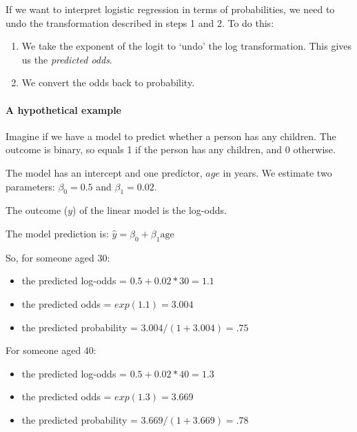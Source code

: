 \documentclass[]{article}
\providecommand{\tightlist}{%
  \setlength{\itemsep}{0pt}\setlength{\parskip}{0pt}}
\let\oldparagraph\paragraph
\renewcommand{\paragraph}[1]{\oldparagraph{#1}\mbox{}}
\begin{document}
If we want to interpret logistic regression in terms of probabilities, we need
to undo the transformation described in steps 1 and 2. To do this:

\begin{enumerate}
\def\labelenumi{\arabic{enumi}.}
\item
  We take the exponent of the logit to `undo' the log transformation. This
  gives us the \emph{predicted odds}.
\item
  We convert the odds back to probability.
\end{enumerate}

\hypertarget{a-hypothetical-example}{%
\paragraph{A hypothetical example}\label{a-hypothetical-example}}

Imagine if we have a model to predict whether a person has any children. The
outcome is binary, so equals 1 if the person has any children, and 0 otherwise.

The model has an intercept and one predictor, \(age\) in years. We estimate two
parameters: \(\beta_0 = 0.5\) and \(\beta_{1} = 0.02\).

The outcome (\(y\)) of the linear model is the log-odds.

The model prediction is: \(\hat{y} = \beta_0 + \beta_1\textrm{age}\)

So, for someone aged 30:

\begin{itemize}
\tightlist
\item
  the predicted log-odds = \(0.5 + 0.02 * 30 = 1.1\)
\item
  the predicted odds = \(exp(1.1) = 3.004\)
\item
  the predicted probability = \(3.004 / (1 + 3.004) = .75\)
\end{itemize}

For someone aged 40:

\begin{itemize}
\tightlist
\item
  the predicted log-odds = \(0.5 + 0.02 * 40 = 1.3\)
\item
  the predicted odds = \(exp(1.3) = 3.669\)
\item
  the predicted probability = \(3.669 / (1 + 3.669) = .78\)
\end{itemize}
\end{document}
